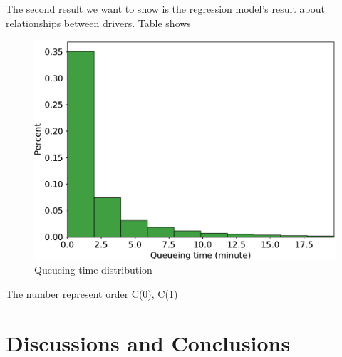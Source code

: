 \documentclass{article}
\begin{document}
The second result we want to show is the regression model's result about relationships between drivers. Table shows 
\begin{figure} [h]
  \centering
  \includegraphics[width=.9\linewidth]{figs/queueTimeDist}
  \caption{Queueing time distribution}
  \label{fig:queueTimeDist}
\end{figure}




The number represent order
C(0), C(1)




\section{Discussions and Conclusions} \label{sec:experiments}








\end{document}
